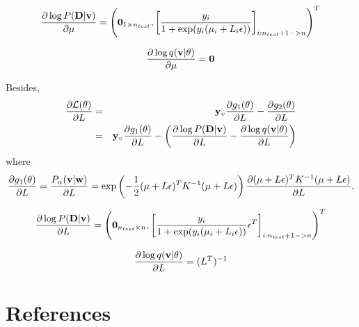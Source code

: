 \documentclass{article}
\def\v{{\bf v}}
\def\y{{\bf y}}
\def\w{{\bf w}}
\def\D{{\bf D}}
\begin{document}
\begin{eqnarray}
\setlength{\abovedisplayskip}{0pt}
\setlength{\belowdisplayskip}{0pt}
\nonumber
\frac{\partial \log P(\D|\v)}{\partial \mu} = \left( \mathbf{0}_{1 \times n_{test}}, \left [ \frac{y_i}{1+\exp(y_i(\mu_i+L_i\epsilon))} \right]_{i: n_{test}+1->n}  \right )^T
\end{eqnarray}




\begin{eqnarray}
\setlength{\abovedisplayskip}{0pt}
\setlength{\belowdisplayskip}{0pt}
\nonumber
\frac{\partial \log q(\v|\theta)}{\partial \mu} = \textbf{0}
\end{eqnarray}

Besides,
\begin{eqnarray}
\setlength{\abovedisplayskip}{0pt}
\setlength{\belowdisplayskip}{0pt}
\nonumber
\frac{\partial \mathcal{L}(\theta)}{\partial L} &=& \y_v \frac{\partial g_1(\theta)}{\partial L} - \frac{\partial g_2(\theta)}{\partial L} \\ \nonumber
&=& \y_v \frac{\partial g_1(\theta)}{\partial L} - \left( \frac{\partial \log P(\D|\v)}{\partial L} - \frac{\partial \log q(\v|\theta)}{\partial L} \right)
\end{eqnarray} where
\begin{eqnarray}
\setlength{\abovedisplayskip}{0pt}
\setlength{\belowdisplayskip}{0pt}
\nonumber
\frac{\partial g_1(\theta)}{\partial L} = \frac{P_{\alpha}(\v|\w)}{\partial L} = \exp\left(-\frac{1}{2}(\mu+L\epsilon)^T K^{-1} (\mu+L\epsilon)\right) \frac{\partial (\mu+L\epsilon)^T K^{-1} (\mu+L\epsilon)}{\partial L},
\end{eqnarray}

\begin{eqnarray}
\setlength{\abovedisplayskip}{0pt}
\setlength{\belowdisplayskip}{0pt}
\nonumber
\frac{\partial \log P(\D|\v)}{\partial L} = \left( \mathbf{0}_{n_{test}\times n}, \left[ \frac{y_i}{1+\exp(y_i(\mu_i+L_i\epsilon))} \epsilon^T \right]_{i: n_{test}+1->n}  \right )^T
\end{eqnarray}




\begin{eqnarray}
\setlength{\abovedisplayskip}{0pt}
\setlength{\belowdisplayskip}{0pt}
\nonumber
\frac{\partial \log q(\v|\theta)}{\partial L} = (L^T)^{-1}
\end{eqnarray}












\section*{References}



\end{document}
